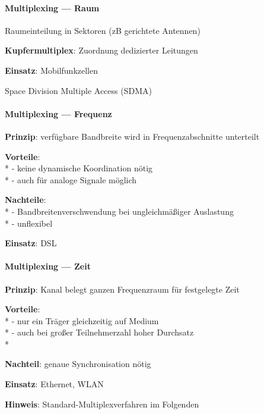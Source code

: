 \paragraph{Multiplexing --- Raum}
\begin{items}
  \item Raumeinteilung in Sektoren (zB gerichtete Antennen)
  \item \textbf{Kupfermultiplex}: Zuordnung dedizierter Leitungen
  \item \textbf{Einsatz}: Mobilfunkzellen
  \item Space Division Multiple Access (SDMA)
\end{items}

\paragraph{Multiplexing --- Frequenz}
\begin{items}
  \item \textbf{Prinzip}: verfügbare Bandbreite wird in Frequenzabschnitte unterteilt
  \item \textbf{Vorteile}: \\*
    - keine dynamische Koordination nötig \\*
    - auch für analoge Signale möglich
  \item \textbf{Nachteile}: \\*
    - Bandbreitenverschwendung bei ungleichmäßiger Auslastung \\*
    - unflexibel
  \item \textbf{Einsatz}: DSL
\end{items}

\paragraph{Multiplexing --- Zeit}
\begin{items}
  \item \textbf{Prinzip}: Kanal belegt ganzen Frequenzraum für festgelegte Zeit
  \item \textbf{Vorteile}: \\*
    - nur ein Träger gleichzeitig auf Medium \\*
    - auch bei großer Teilnehmerzahl hoher Durchsatz \\*
  \item \textbf{Nachteil}: genaue Synchronisation nötig
  \item \textbf{Einsatz}: Ethernet, WLAN
  \item \textbf{Hinweis}: Standard-Multiplexverfahren im Folgenden
\end{items}


